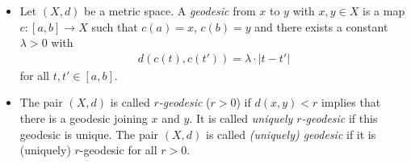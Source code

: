 \begin{defin}[Geodesics]%
  \begin{itemize}
  \item Let \((X, d)\) be a metric space. A \emph{geodesic} from \(x\) to \(y\) with \(x,y \in X\) is a map \(c\colon [a,b] \to X\) such that \(c(a) = x\), \(c(b) = y\) and there exists a constant \(\lambda > 0\) with
    \begin{align*}
      d(c(t), c(t')) = \lambda \cdot |t - t'| 
    \end{align*}
    for all \(t,t' \in [a,b]\).
  \item The pair \((X,d)\) is called \emph{\(r\)-geodesic} (\(r > 0\)) if \(d(x,y) < r\) implies that there is a geodesic joining \(x\) and \(y\). It is called \emph{uniquely \(r\)-geodesic} if this geodesic is unique. The pair \((X,d)\) is called \emph{(uniquely) geodesic} if it is (uniquely) \(r\)-geodesic for all \(r > 0\).
  \end{itemize}
\end{defin}

